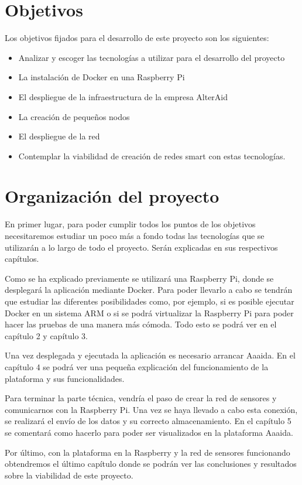 \section{Objetivos}

Los objetivos fijados para el desarrollo de este proyecto son los siguientes:

\begin{itemize}
\item Analizar y escoger las tecnologías a utilizar para el desarrollo del proyecto
\item La instalación de Docker en una Raspberry Pi
\item El despliegue de la infraestructura de la empresa AlterAid
\item La creación de pequeños nodos
\item El despliegue de la red
\item Contemplar la viabilidad de creación de redes smart con estas tecnologías. 
\end{itemize}
\pagebreak

\section{Organización del proyecto}

En primer lugar, para poder cumplir todos los puntos de los objetivos necesitaremos estudiar un poco más a fondo todas las tecnologías que se utilizarán a lo largo de todo el proyecto. Serán explicadas en sus respectivos capítulos.

Como se ha explicado previamente se utilizará una Raspberry Pi, donde se desplegará la aplicación mediante Docker. Para poder llevarlo a cabo se tendrán que estudiar las diferentes posibilidades como, por ejemplo, si es posible ejecutar Docker en un sistema ARM o si se podrá virtualizar la Raspberry Pi para poder hacer las pruebas de una manera más cómoda. Todo esto se podrá ver en el capítulo 2 y capítulo 3.

Una vez desplegada y ejecutada la aplicación es necesario arrancar Aaaida. En el capítulo 4 se podrá ver una pequeña explicación del funcionamiento de la plataforma y sus funcionalidades. 

Para terminar la parte técnica, vendría el paso de crear la red de sensores y
comunicarnos con la Raspberry Pi. Una vez se haya llevado a cabo esta conexión, se realizará el envío de los datos y su correcto almacenamiento. En el capítulo 5 se comentará como hacerlo para poder ser visualizados en la plataforma Aaaida. 

Por último, con la plataforma en la Raspberry y la red de sensores funcionando obtendremos el último capítulo donde se podrán ver las conclusiones y resultados sobre la viabilidad de este proyecto.
